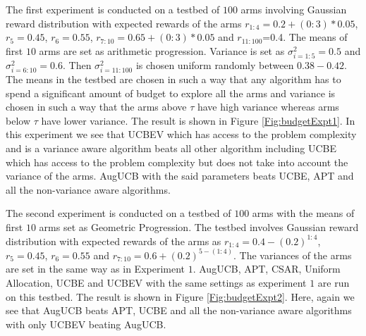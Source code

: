 	The first experiment is conducted on a testbed of $100$ arms involving Gaussian reward distribution with expected rewards of the arms $r_{1:4}=0.2+(0:3)*0.05$, $r_{5}=0.45$, $r_{6}=0.55$, $r_{7:10}=0.65+(0:3)*0.05$ and $r_{11:100}$=0.4. The means of first $10$ arms are set as arithmetic progression. Variance is set as $\sigma_{i=1:5}^{2}=0.5$ and $\sigma_{i=6:10}^{2}=0.6$. Then $\sigma_{i=11:100}^{2}$ is chosen uniform randomly between $0.38-0.42$. The means in the testbed are chosen in such a way that any algorithm has to spend a significant amount of budget to explore all the arms and variance is chosen in such a way that the arms above $\tau$ have high variance whereas arms below $\tau$ have lower variance. The result is shown in Figure \ref{Fig:budgetExpt1}. In this experiment we see that UCBEV which has access to the problem complexity and is a variance aware algorithm beats all other algorithm including UCBE which has access to the problem complexity but does not take into account the variance of the arms. AugUCB with the said parameters beats UCBE, APT and all the non-variance aware algorithms.
	
	The second experiment is conducted on a testbed of $100$ arms with the means of first $10$ arms set as Geometric Progression. The testbed involves Gaussian reward distribution with expected rewards of the arms as $r_{1:4}=0.4-(0.2)^{1:4}$, $r_{5}=0.45$, $r_{6}=0.55$ and $r_{7:10}=0.6+(0.2)^{5-(1:4)}$. The variances of the arms are set in the same way as in Experiment $1$. AugUCB, APT, CSAR, Uniform Allocation, UCBE and UCBEV with the same settings as experiment $1$ are run on this testbed. The result is shown in Figure \ref{Fig:budgetExpt2}. Here, again we see that AugUCB beats APT, UCBE and all the non-variance aware algorithms with only UCBEV beating AugUCB. 
	
	


